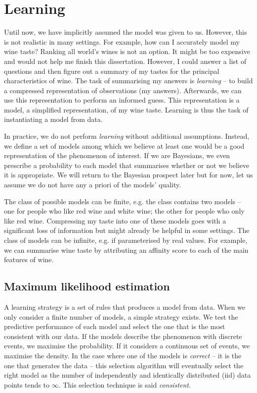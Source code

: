 \section{Learning}
Until now, we have implicitly assumed the model was given to us. However, this is not realistic in many settings. For example, how can I accurately model my wine taste? Ranking all world's wines is not an option. It might be too expensive and would not help me finish this dissertation. However, I could answer a list of questions and then figure out a summary of my tastes for the principal characteristics of wine. The task of summarising my answers is \textit{learning} -- to build a compressed representation of observations (my answers). Afterwards, we can use this representation to perform an informed guess. This representation is a model, a simplified representation, of my wine taste. Learning is thus the task of instantiating a model from data.

In practice, we do not perform \textit{learning} without additional assumptions. Instead, we define a set of models among which we believe at least one would be a good representation of the phenomenon of interest. If we are Bayesians, we even prescribe a probability to each model that summarises whether or not we believe it is appropriate. We will return to the Bayesian prospect later but for now, let us assume we do not have any a priori of the models' quality.

The class of possible models can be finite, e.g. the class contains two models -- one for people who like red wine and white wine; the other for people who only like red wine. Compressing my taste into one of these models goes with a significant loss of information but might already be helpful in some settings. The class of models can be infinite, e.g. if parameterised by real values. For example, we can summarise wine taste by attributing an affinity score to each of the main features of wine.
\subsection{Maximum likelihood estimation}
A learning strategy is a set of rules that produces a model from data. When we only consider a finite number of models, a simple strategy exists. We test the predictive performance of each model and select the one that is the most consistent with our data. If the models describe the phenomenon with discrete events, we maximise the probability. If it considers a continuous set of events, we maximise the density. In the case where one of the models is \textit{correct} -- it is the one that generates the data -- this selection algorithm will eventually select the right model as the number of independently and identically distributed (iid) data points tends to $\infty$. This selection technique is said \textit{consistent}.

